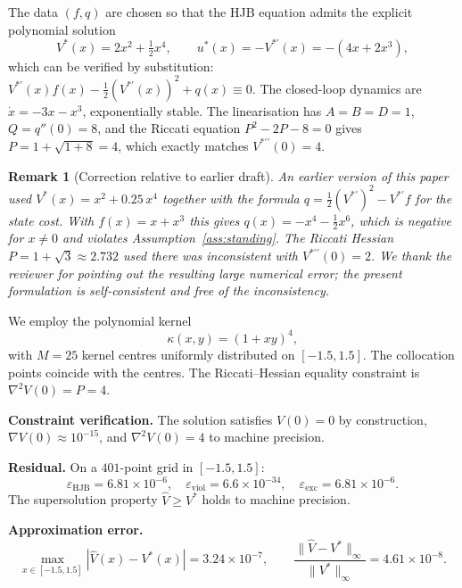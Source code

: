 \documentclass[11pt]{article}
\newtheorem{remark}[theorem]{Remark}
\begin{document}
The data $(f,q)$ are chosen so that the HJB equation admits the explicit polynomial solution
\begin{equation}
V^*(x) = 2x^2 + \tfrac12 x^4, \qquad u^*(x) = -V^{*\prime}(x) = -(4x + 2x^3),
\label{eq:1d_Vstar}
\end{equation}
which can be verified by substitution: $V^{*\prime}(x)f(x) - \tfrac12 (V^{*\prime}(x))^2 + q(x) \equiv 0$. The closed-loop dynamics are $\dot{x} = -3x - x^3$, exponentially stable. The linearisation has $A=B=D=1$, $Q = q''(0) = 8$, and the Riccati equation $P^2 - 2P - 8 = 0$ gives $P = 1 + \sqrt{1+8} = 4$, which exactly matches $V^{*\prime\prime}(0) = 4$.

\begin{remark}[Correction relative to earlier draft]
An earlier version of this paper used $V^*(x) = x^2 + 0.25\,x^4$ together with the formula $q = \tfrac12(V^{*\prime})^2 - V^{*\prime}f$ for the state cost. With $f(x) = x + x^3$ this gives $q(x) = -x^4 - \tfrac12 x^6$, which is negative for $x\neq 0$ and violates Assumption~\ref{ass:standing}. The Riccati Hessian $P = 1+\sqrt{3}\approx 2.732$ used there was inconsistent with $V^{*\prime\prime}(0) = 2$. We thank the reviewer for pointing out the resulting large numerical error; the present formulation is self-consistent and free of the inconsistency.
\end{remark}

We employ the polynomial kernel
\begin{equation}
\kappa(x,y) = (1 + xy)^{4},
\label{eq:poly_kernel}
\end{equation}
with $M = 25$ kernel centres uniformly distributed on $[-1.5, 1.5]$. The collocation points coincide with the centres. The Riccati--Hessian equality constraint is $\nabla^2 V(0) = P = 4$.

\textbf{Constraint verification.} The solution satisfies $V(0) = 0$ by construction, $\nabla V(0) \approx 10^{-15}$, and $\nabla^2 V(0) = 4$ to machine precision.

\textbf{Residual.} On a $401$-point grid in $[-1.5, 1.5]$:
\[
\varepsilon_{\mathrm{HJB}} = 6.81\times 10^{-6},\quad
\varepsilon_{\mathrm{viol}} = 6.6\times 10^{-34},\quad
\varepsilon_{\mathrm{exc}} = 6.81\times 10^{-6}.
\]
The supersolution property $\hat V \geq V^*$ holds to machine precision.

\textbf{Approximation error.}
\[
\max_{x\in[-1.5,1.5]}|\hat V(x) - V^*(x)| = 3.24\times 10^{-7},\qquad
\frac{\|\hat V - V^*\|_\infty}{\|V^*\|_\infty} = 4.61\times 10^{-8}.
\]
\end{document}

